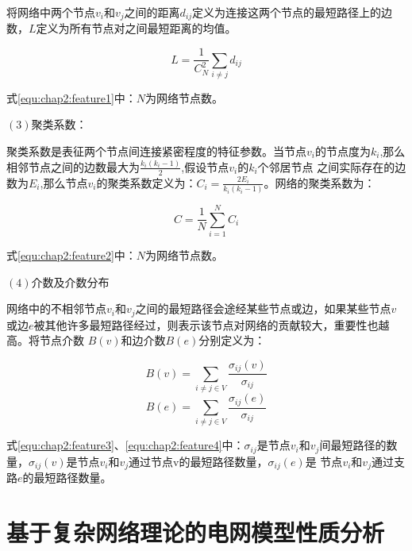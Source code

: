 将网络中两个节点$v_i$和$v_j$之间的距离$d_{ij}$定义为连接这两个节点的最短路径上的边数，$L$定义为所有节点对之间最短距离的均值。

\begin{equation}
    \label{equ:chap2:feature1}
    L=\frac{1}{C_N^2} \sum_{i \neq j} d_{i j}
\end{equation}

式\ref{equ:chap2:feature1}中：$N$为网络节点数。

$(3)$聚类系数：

聚类系数是表征两个节点间连接紧密程度的特征参数。当节点$v_i$的节点度为$k_i$,那么相邻节点之间的边数最大为$\frac{k_i(k_i-1)}{2}$,假设节点$v_i$的$k_i$个邻居节点
之间实际存在的边数为$E_i$,那么节点$v_i$的聚类系数定义为：$C_i=\frac{2E_i}{k_i(k_i-1)}$。网络的聚类系数为：

\begin{equation} 
    \label{equ:chap2:feature2}
    C=\frac{1}{N} \sum_{i=1}^N C_i
\end{equation}

式\ref{equ:chap2:feature2}中：$N$为网络节点数。

$(4)$介数及介数分布

网络中的不相邻节点$v_i$和$v_j$之间的最短路径会途经某些节点或边，如果某些节点$v$或边$e$被其他许多最短路径经过，则表示该节点对网络的贡献较大，重要性也越高。将节点介数
$B(v)$和边介数$B(e)$分别定义为：

\begin{equation} 
    \label{equ:chap2:feature3}
    B(v)=\sum_{i \neq j\in V} \frac{\sigma_{ij}(v)}{\sigma_{ij}} 
\end{equation}
\begin{equation} 
    \label{equ:chap2:feature4}
    B(e)=\sum_{i \neq j\in V} \frac{\sigma_{ij}(e)}{\sigma_{ij}} 
\end{equation}

式\ref{equ:chap2:feature3}、\ref{equ:chap2:feature4}中：$\sigma_{ij}$是节点$v_i$和$v_j$间最短路径的数量，$\sigma_{ij}(v)$是节点$v_i$和$v_j$通过节点v的最短路径数量，$\sigma_{ij}(e)$是
节点$v_i$和$v_j$通过支路$e$的最短路径数量。

\section{基于复杂网络理论的电网模型性质分析}
\label{sec:complexGrid}


